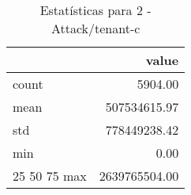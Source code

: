 \begin{table}[htbp]
\caption{Estatísticas para 2 - Attack/tenant-c}
\label{tab:2_-_attack_tenant-c_summary}
\begin{tabular}{lr}
\toprule
 & value \\
\midrule
count & 5904.00 \\
mean & 507534615.97 \\
std & 778449238.42 \\
min & 0.00 \\
25%
50%
75%
max & 2639765504.00 \\
\bottomrule
\end{tabular}
\end{table}
